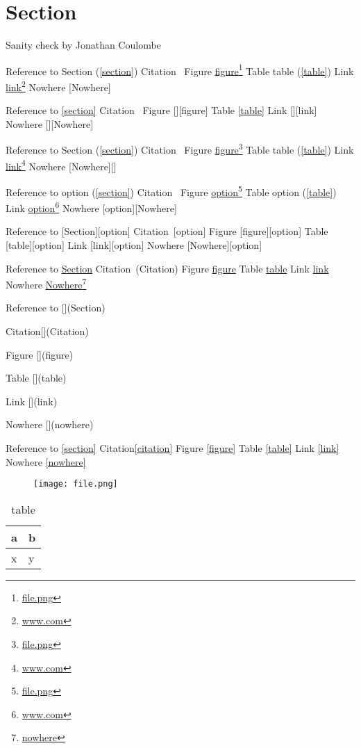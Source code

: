 
\def\mytitle{MultiMarkdown Sanity Test  }
\def\latexmode{memoir}

\part{Section}
\label{section}

Sanity check by Jonathan Coulombe

Reference to Section (\autoref{section})
Citation~\cite{Citation}
Figure \href{file.png}{figure}\footnote{\href{file.png}{file.png}}
Table table (\autoref{table})
Link \href{www.com}{link}\footnote{\href{www.com}{www.com}}
Nowhere [Nowhere]

Reference to \autoref{section}
Citation~\cite{Citation}
Figure [][figure]
Table \autoref{table}
Link [][link]
Nowhere [][Nowhere]

Reference to Section (\autoref{section})
Citation~\cite{Citation}
Figure \href{file.png}{figure}\footnote{\href{file.png}{file.png}}
Table table (\autoref{table})
Link \href{www.com}{link}\footnote{\href{www.com}{www.com}}
Nowhere [Nowhere][]

Reference to option (\autoref{section})
Citation~\cite[option]{Citation}
Figure \href{file.png}{option}\footnote{\href{file.png}{file.png}}
Table option (\autoref{table})
Link \href{www.com}{option}\footnote{\href{www.com}{www.com}}
Nowhere [option][Nowhere]

Reference to [Section][option]
Citation~\cite{Citation}[option]
Figure [figure][option]
Table [table][option]
Link [link][option]
Nowhere [Nowhere][option]

Reference to \href{Section}{Section}
Citation~\cite{Citation}(Citation)
Figure \href{figure}{figure}
Table \href{table}{table}
Link \href{link}{link}
Nowhere \href{nowhere}{Nowhere}\footnote{\href{nowhere}{nowhere}}

Reference to [](Section)

Citation[](Citation)

Figure [](figure)

Table [](table)

Link [](link)

Nowhere [](nowhere)

Reference to \autoref{section}
Citation\autoref{citation}
Figure \autoref{figure}
Table \autoref{table}
Link \autoref{link}
Nowhere \autoref{nowhere}

\begin{figure}[htbp]
\centering
\texttt{[image: file.png]}
\label{figure}
\end{figure}


\begin{table}[htbp]
\begin{minipage}{\linewidth}
\setlength{\tymax}{0.5\linewidth}
\centering
\small
\caption{table}
\label{table}
\begin{tabular}{@{}ll@{}} \toprule
a&b\\
\midrule
x&y\\

\bottomrule

\end{tabular}
\end{minipage}
\end{table}





